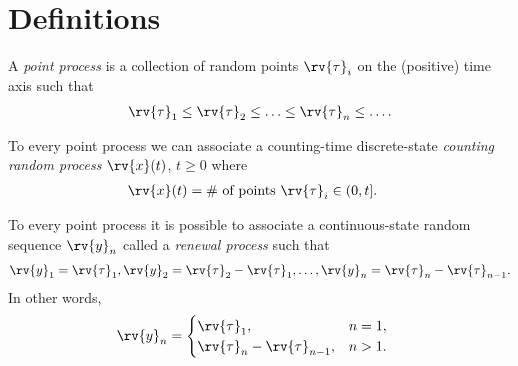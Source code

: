 \section{Definitions}
\begin{definitionBox}
    A \emph{point process} is a collection of random points $\rv{\tau}_{i}$ on the (positive) time axis such that
    \begin{align}
        \rv{\tau}_{1}\leq \rv{\tau}_{2}\leq\ldots\leq\rv{\tau}_{n}\leq\ldots.
    \end{align}
\end{definitionBox}

\begin{definitionBox}
    To every point process we can associate a counting-time discrete-state \emph{counting random process} $\rv{x}(t)$, $t\geq 0$ where
    \begin{align}
        \rv{x}(t) &= \text{\# of points } \rv{\tau}_{i}\in(0,t].
    \end{align}
\end{definitionBox}

\begin{definitionBox}
    To every point process it is possible to associate a continuous-state random sequence $\rv{y}_{n}$ called a \emph{renewal process} such that 
    \begin{align}
        \rv{y}_{1} = \rv{\tau}_{1}, \rv{y}_{2} = \rv{\tau}_{2} - \rv{\tau}_{1},\ldots, \rv{y}_{n}=\rv{\tau}_{n} - \rv{\tau}_{n-1}.
    \end{align}
    In other words,
    \begin{align}
        \rv{y}_{n} &= 
        \begin{cases}
            \rv{\tau}_{1}, & n=1,\\
            \rv{\tau}_{n} - \rv{\tau}_{n-1}, & n>1.
        \end{cases}
    \end{align}
\end{definitionBox}

